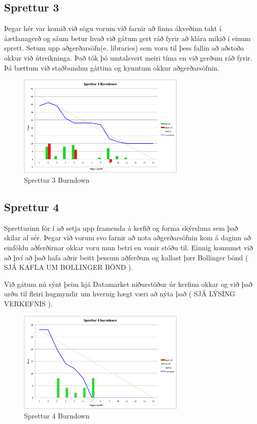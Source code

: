 \documentclass{article}
\begin{document}
\subsection{Sprettur 3}
Þegar hér var komið við sögu vorum við farnir að finna ákveðinn takt í áætlanagerð og sáum betur hvað við gátum gert ráð fyrir að klára mikið 
í einum sprett. Setum upp aðgerðarsöfn(e. libraries) sem voru til þess fallin að aðstoða okkur við útreikninga. Það tók þó umtalsvert meiri tíma en við gerðum
ráð fyrir. Þá bættum við staðbundnu gáttina og kynntum okkur aðgerðarsöfnin.
\begin{figure}[H]
 \centering
 \includegraphics[width=0.72\textwidth]{Sprettur3_Burndown.png}
 \caption{Sprettur 3 Burndown}
\end{figure}
\subsection{Sprettur 4}
Spretturinn fór í að setja upp framenda á kerfið og forma skýrsluna sem það skilar af sér. Þegar við vorum svo farnir að nota aðgerðarsöfnin 
kom á daginn að einföldu aðferðirnar okkar voru mun betri en vonir stóðu til. Einnig komumst við að því að það hafa aðrir beitt þessum aðferðum 
og kallast þær Bollinger bönd ( SJÁ KAFLA UM BOLLINGER BÖND ). 

Við gátum nú sýnt þeim hjá Datamarket niðurstöður úr kerfinu okkar og við það urðu til fleiri hugmyndir um hvernig hægt væri að nýta það ( SJÁ LÝSING VERKEFNIS ).

\begin{figure}[H]
 \centering
 \includegraphics[width=0.72\textwidth]{Sprettur4_Burndown.png}
 \caption{Sprettur 4 Burndown}
\end{figure}
\end{document}
